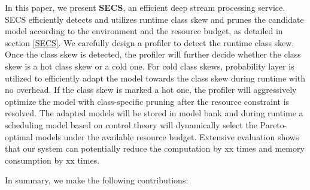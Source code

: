 \documentclass[pageno]{jpaper}
\begin{document}

In this paper, we present \textbf{SECS}, an efficient deep stream processing service. SECS efficiently detects and utilizes runtime class skew and prunes the candidate model according to the environment and the resource budget, as detailed in section \ref{SECS}. We carefully design a profiler to detect the runtime class skew. Once the class skew is detected, the profiler will further decide whether the class skew is a hot class skew or a cold one. For cold class skews, probability layer is utilized to efficiently adapt the model towards the class skew during runtime with no overhead. If the class skew is marked a hot one, the profiler will aggressively optimize the model with class-specific pruning after the resource constraint is resolved. The adapted models will be stored in model bank and during runtime a scheduling model based on control theory will dynamically select the Pareto-optimal models under the available resource budget. Extensive evaluation shows that our system can potentially reduce the computation by xx times and memory consumption by xx times.

In summary, we make the following contributions:
\end{document}
